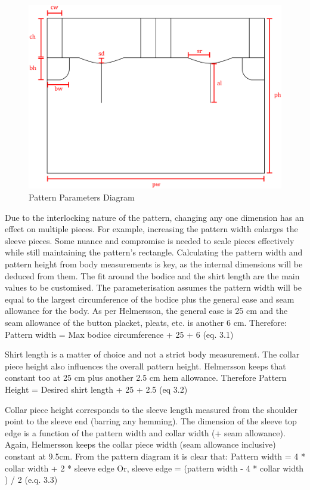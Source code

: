 \begin{figure} [h]
    \centering
    \includegraphics[width = \textwidth]{Images/pattern params.png}
    \caption{Pattern Parameters Diagram}
    \label{fig:pattern params}
\end{figure}

Due to the interlocking nature of the pattern, changing any one dimension has an effect on multiple pieces.
For example, increasing the pattern width enlarges the sleeve pieces. Some nuance and compromise is needed to scale pieces effectively while still maintaining the pattern’s rectangle. 
Calculating the pattern width and pattern height from body measurements is key, as the internal dimensions will be deduced from them. The fit around the bodice and the shirt length are the main values to be customised. The parameterisation assumes the pattern width will be equal to the largest circumference of the bodice plus the general ease and seam allowance for the body.
As per Helmersson, the general ease is 25 cm and the seam allowance of the button placket, pleats, etc. is another 6 cm. Therefore:
Pattern width = Max bodice circumference + 25 + 6   (eq. 3.1)

Shirt length is a matter of choice and not a strict body measurement. The collar piece height also influences the overall pattern height. Helmersson keeps that constant too at 25 cm plus another 2.5 cm hem allowance. Therefore
	Pattern Height = Desired shirt length + 25 + 2.5    (eq 3.2)

Collar piece height corresponds to the sleeve length measured from the shoulder point to the sleeve end (barring any hemming). The dimension of the sleeve top edge is a function of the pattern width and collar width (+ seam allowance). Again, Helmersson keeps the collar piece width (seam allowance inclusive)
 constant at 9.5cm. From the pattern diagram it is clear that:
	Pattern width = 4 * collar width + 2 * sleeve edge
	Or, sleeve edge = (pattern width - 4 * collar width ) / 2  (e.q. 3.3)

